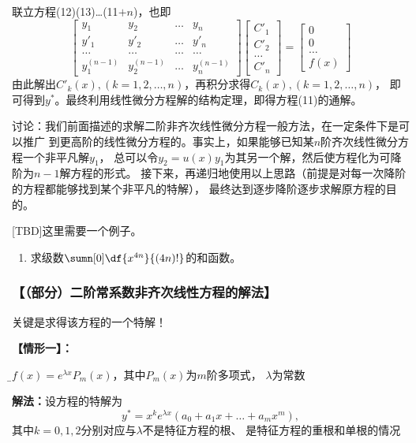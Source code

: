 \begin{shaded}
	联立方程(12)(13)\ldots(11$+n$)，也即
	$$\left[\begin{array}{cccc}
	y_1 & y_2 & \ldots & y_n\\
	y'_1 & y'_2 & \ldots & y'_n\\
	\ldots & \ldots & \ldots &\ldots\\
	y^{(n-1)}_1 & y^{(n-1)}_2 & \ldots & y^{(n-1)}_n
	\end{array}
	\right]
	\left[\begin{array}{c}
	C'_1 \\ C'_2 \\ \ldots \\ C'_n 
	\end{array}\right]
	=\left[\begin{array}{c}
	0 \\ 0 \\ \ldots \\ f(x)
	\end{array}\right]$$
	由此解出$C'_k(x),(k=1,2,\ldots,n)$，再积分求得$C_k(x),(k=1,2,\ldots,n)$，
	即可得到$y^*$。最终利用线性微分方程解的结构定理，即得方程(11)的通解。
	
	
	讨论：我们前面描述的求解二阶非齐次线性微分方程一般方法，在一定条件下是可以推广
	到更高阶的线性微分方程的。事实上，如果能够已知某$n$阶齐次线性微分方程一个非平凡解$y_1$，
	总可以令$y_2=u(x)y_1$为其另一个解，然后使方程化为可降阶为$n-1$解方程的形式。
	接下来，再递归地使用以上思路（前提是对每一次降阶的方程都能够找到某个非平凡的特解），
	最终达到逐步降阶逐步求解原方程的目的。
	
	[TBD]这里需要一个例子。
\end{shaded}

\begin{ext}
	\begin{enumerate}
	  \item 求级数$\sumn[0]\df{x^{4n}}{(4n)!}$的和函数。
	\end{enumerate}
\end{ext}

\subsubsection{【（部分）二阶常系数非齐次线性方程的解法】}

关键是求得该方程的一个特解！

{\bf 【情形一】：}{\b$f(x)=e^{\lambda x}P_m(x)$，其中$P_m(x)$为$m$阶多项式，
$\lambda$为常数

{\bf 解法：}设方程的特解为
$$y^*=x^ke^{\lambda x}(a_0+a_1x+\ldots+a_mx^m),$$
其中$k=0,1,2$分别对应与$\lambda$不是特征方程的根、
是特征方程的重根和单根的情况}

